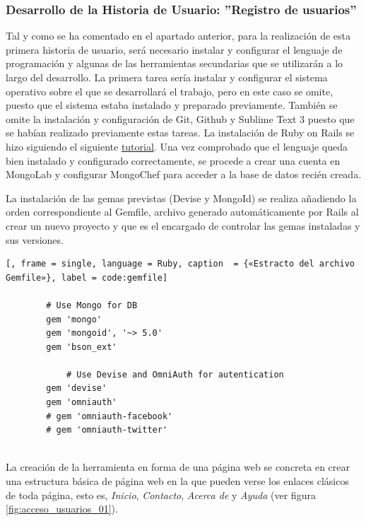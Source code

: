 	\subsubsection{Desarrollo de la Historia de Usuario: ''Registro de usuarios'' }
	Tal y como se ha comentado en el apartado anterior, para la realización de esta primera historia de usuario, será necesario instalar y configurar el lenguaje de programación y algunas de las herramientas secundarias que se utilizarán a lo largo del desarrollo.
	La primera tarea sería instalar y configurar el sistema operativo sobre el que se desarrollará el trabajo, pero en este caso se omite, puesto que el sistema estaba instalado y preparado previamente. También se omite la instalación y configuración de Git, Github y Sublime Text 3 puesto que se habían realizado previamente estas tareas.
	La instalación de Ruby on Rails se hizo siguiendo el siguiente \href{http://railsapps.github.io/installrubyonrails-ubuntu.html}{tutorial}.
	Una vez comprobado que el lenguaje queda bien instalado y configurado correctamente, se procede a crear una cuenta en MongoLab y configurar MongoChef para acceder a la base de datos recién creada.
	
	La instalación de las gemas previstas (Devise y MongoId) se realiza añadiendo la orden correspondiente al Gemfile, archivo generado automáticamente por Rails al crear un nuevo proyecto y que es el encargado de controlar las gemas instaladas y sus versiones.
	
	\begin{lstlisting}[, frame = single, language = Ruby, caption  = {«Estracto del archivo Gemfile»}, label = code:gemfile]
		
		# Use Mongo for DB
		gem 'mongo'
		gem 'mongoid', '~> 5.0'
		gem 'bson_ext'
		
			# Use Devise and OmniAuth for autentication
		gem 'devise'
		gem 'omniauth'
		# gem 'omniauth-facebook'
		# gem 'omniauth-twitter'
		
	\end{lstlisting}
	
	La creación de la herramienta en forma de una página web se concreta en crear una estructura básica de página web en la que pueden verse los enlaces clásicos de toda página, esto es, \textit{Inicio}, \textit{Contacto}, \textit{Acerca de} y \textit{Ayuda} (ver figura \ref{fig:acceso_usuarios_01}).\\
	
